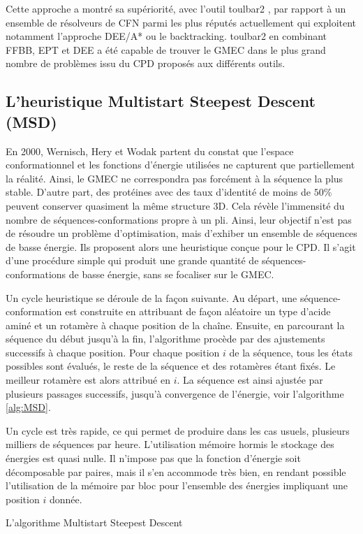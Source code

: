 Cette approche a montré sa supériorité, avec l'outil toulbar2 \cite{Allouche14,Traore13}, par rapport à un ensemble de résolveurs de CFN parmi les plus réputés actuellement qui exploitent notamment l'approche DEE/A* ou le backtracking. toulbar2 en combinant FFBB, EPT et DEE a été capable de trouver le GMEC dans le plus grand nombre de problèmes issu du CPD proposés aux différents outils.
\subsection{L'heuristique Multistart Steepest Descent (MSD)}
\label{MSD}
En 2000, Wernisch, Hery et Wodak \cite{Wernisch00} partent du constat que l'espace conformationnel et les fonctions d'énergie utilisées ne capturent que partiellement la réalité. Ainsi, le GMEC ne correspondra pas forcément à la séquence la plus stable. D'autre part, des protéines avec des taux d'identité de moins de $50\%$ peuvent conserver quasiment la même structure 3D. Cela révèle l'immensité du nombre de séquences-conformations propre à un pli. Ainsi, leur objectif n'est pas de résoudre un problème d'optimisation, mais d'exhiber un ensemble de séquences de basse énergie. Ils proposent alors une heuristique conçue pour le CPD. Il s'agit d'une procédure simple qui produit une grande quantité de séquences-conformations de basse énergie, sans se focaliser sur le GMEC.

Un cycle heuristique se déroule de la façon suivante. Au départ, une séquence-conformation est construite en attribuant de façon aléatoire un type d'acide aminé et un rotamère à chaque position de la chaîne. Ensuite, en parcourant la séquence du début jusqu'à la fin, l'algorithme procède par des ajustements successifs à chaque position. Pour chaque position $i$ de la séquence, tous les états possibles sont évalués, le reste de la séquence et des rotamères étant fixés. Le meilleur rotamère est alors attribué en $i$. La séquence est ainsi ajustée par plusieurs passages successifs, jusqu'à convergence de l'énergie, voir l'algorithme \ref{alg:MSD}.

Un cycle est très rapide, ce qui permet de produire dans les cas usuels, plusieurs milliers de séquences par heure. L'utilisation mémoire hormis le stockage des énergies est quasi nulle. Il n'impose pas que la fonction d'énergie soit décomposable par paires, mais il s'en accommode très bien, en rendant possible l'utilisation de la mémoire par bloc pour l'ensemble des énergies impliquant une position $i$ donnée.

\begin{algorithm}
  \caption{L'algorithme Multistart Steepest Descent}\label{alg:MSD}
\end{algorithm}


